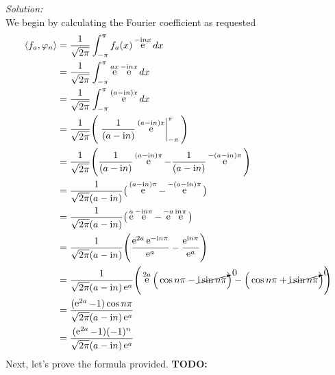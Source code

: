 \documentclass[10pt]{amsart}
\newcommand{\I}{\mathrm{i}}
\DeclareMathOperator{\E}{e}
\theoremstyle{nonumberplain}
\begin{document}
\begin{enumerate}[label={\bf {\arabic*}:}]
\noindent
\textit{Solution:} \\
We begin by calculating the Fourier coefficient as requested
\begin{align*}
\langle f_a, \varphi_n \rangle &= \frac 1 {\sqrt{2 \pi}} \int_{-\pi}^{\pi} f_a(x) \E^{- \I n x} dx \\
	&= \frac 1 {\sqrt{2 \pi}} \int_{-\pi}^{\pi} \E^{ax} \E^{- \I n x} dx \\
	&= \frac 1 {\sqrt{2 \pi}} \int_{-\pi}^{\pi} \E^{(a - \I n) x} dx \\
	&= \frac 1 {\sqrt{2 \pi}} \Bigg( \left. \frac 1 {(a - \I n)} \E^{(a - \I n) x} \right|_{-\pi}^{\pi} \Bigg) \\
	&= \frac 1 {\sqrt{2 \pi}} \Bigg( \frac 1 {(a - \I n)} \E^{(a - \I n) \pi} - \frac 1 {(a - \I n)} \E^{- (a - \I n) \pi} \Bigg) \\
	&= \frac 1 {\sqrt{2 \pi}(a - \I n)} \big( \E^{(a - \I n) \pi} - \E^{- (a - \I n) \pi} \big) \\
	&= \frac 1 {\sqrt{2 \pi}(a - \I n)} \big( \E^a \E^{- \I n \pi} - \E^{- a} \E^{ \I n \pi} \big) \\
	&= \frac 1 {\sqrt{2 \pi}(a - \I n)} \Bigg( \frac {\E^{2a} \E^{- \I n \pi}}{\E^a} - \frac {\E^{ \I n \pi}}{\E^{a}}\Bigg) \\
	&= \frac 1 {\sqrt{2 \pi}(a - \I n)\E^a} \Bigg( \E^{2a} \Big( \cos{n \pi} - \cancelto{0}{\I \sin n \pi} \Big) - \Big( \cos{n \pi} + \cancelto{0}{\I \sin n \pi} \Big)\Bigg) \\
	&= \frac {(\E^{2a} - 1)\cos n \pi }{\sqrt{2 \pi}(a - \I n)\E^a} \\
	&= \frac {(\E^{2a} - 1)(-1)^n }{\sqrt{2 \pi}(a - \I n)\E^a}
\end{align*}
Next, let's prove the formula provided.
\textbf{TODO: }
\end{enumerate}
\end{document}
